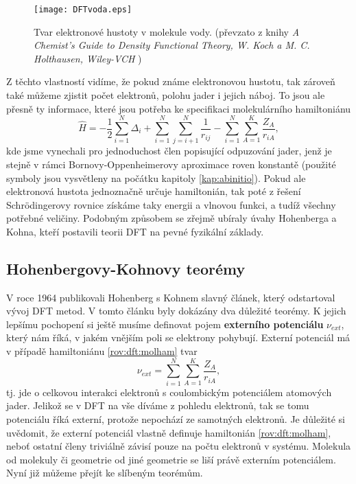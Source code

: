 \begin{figure}
\centering
\texttt{[image: DFTvoda.eps]}
\caption[Elektronová hustota]{Tvar elektronové hustoty v molekule vody. (převzato z knihy \textit{A Chemist’s Guide to
Density Functional Theory, W. Koch a M. C. Holthausen,  Wiley-VCH}
)}
\label{obr:dftvoda}
\end{figure}

Z těchto vlastností vidíme, že pokud známe elektronovou hustotu, tak zároveň také můžeme zjistit počet elektronů, polohu jader i jejich náboj. To jsou ale přesně ty informace, které jsou potřeba ke specifikaci molekulárního hamiltoniánu
\begin{equation}
\hat{H}= -\frac{1}{2} \sum_{i=1}^N\Delta_i+\sum_{i=1}^N\sum_{j=i+1}^N\frac{1}{r_{ij}}-\sum_{i=1}^N\sum_{A=1}^K \frac{Z_A}{r_{iA}} ,
\label{rov:dft:molham}
\end{equation}
kde jsme vynechali pro jednoduchost člen popisující odpuzování jader, jenž je stejně v rámci Bornovy-Oppenheimerovy aproximace roven konstantě (použité symboly jsou vysvětleny na počátku kapitoly \ref{kap:abinitio}). Pokud ale elektronová hustota jednoznačně určuje hamiltonián, tak poté z řešení Schr\"odingerovy rovnice získáme taky energii a vlnovou funkci, a tudíž všechny potřebné veličiny. Podobným způsobem se zřejmě ubíraly úvahy Hohenberga a Kohna, kteří postavili teorii DFT na pevné fyzikální základy.

\subsection{Hohenbergovy-Kohnovy teorémy}

V roce 1964 publikovali Hohenberg s Kohnem slavný článek, který odstartoval vývoj DFT metod.
V tomto článku byly dokázány dva důležité teorémy. K jejich lepšímu pochopení si ještě musíme definovat pojem \textbf{externího potenciálu} $\nu_{ext}$, který nám říká, v jakém vnějším poli se elektrony pohybují. Externí potenciál má v případě hamiltoniánu \eqref{rov:dft:molham} tvar
\begin{equation}
\nu_{ext} = \sum_{i=1}^N\sum_{A=1}^K \frac{Z_A}{r_{iA}} ,
\end{equation} 
tj. jde o celkovou interakci elektronů s coulombickým potenciálem atomových jader. Jelikož se v DFT na vše díváme z pohledu elektronů, tak se tomu potenciálu říká externí, protože nepochází ze samotných elektronů.
Je důležité si uvědomit, že externí potenciál vlastně definuje hamiltonián \eqref{rov:dft:molham}, neboť ostatní členy triviálně závisí pouze na počtu elektronů v systému. Molekula od molekuly či geometrie od jiné geometrie se liší právě externím potenciálem. Nyní již můžeme přejít ke slíbeným teorémům.

